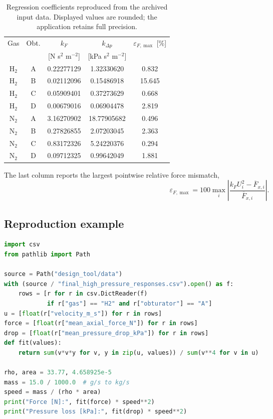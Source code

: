\begin{table}[H]
\centering\small
\begin{tabular}{@{}ccccc@{}}
\toprule
Gas & Obt. & $k_F$ & $k_{\Delta p}$ & $\varepsilon_{F,\max}$ [\%]\\
 & & [N s$^2$ m$^{-2}$] & [kPa s$^2$ m$^{-2}$] & \\
\midrule
$\mathrm{H}_2$ & A & 0.22277129 & 1.32330620 & 0.832\\
$\mathrm{H}_2$ & B & 0.02112096 & 0.15486918 & 15.645\\
$\mathrm{H}_2$ & C & 0.05909401 & 0.37273629 & 0.668\\
$\mathrm{H}_2$ & D & 0.00679016 & 0.06904478 & 2.819\\
\midrule
$\mathrm{N}_2$ & A & 3.16270902 & 18.77905682 & 0.496\\
$\mathrm{N}_2$ & B & 0.27826855 & 2.07203045 & 2.363\\
$\mathrm{N}_2$ & C & 0.83172326 & 5.24220376 & 0.294\\
$\mathrm{N}_2$ & D & 0.09712325 & 0.99642049 & 1.881\\
\bottomrule
\end{tabular}
\caption{Regression coefficients reproduced from the archived input data. Displayed values are rounded; the application retains full precision.}
\label{tab:app_fit_coefficients}
\end{table}

The last column reports the largest pointwise relative force mismatch,
\[
\varepsilon_{F,\max}=100\max_i\left|\frac{k_F U_i^2-\overline F_{x,i}}{\overline F_{x,i}}\right|.
\]

\clearpage
\subsection{Reproduction example}
\begin{lstlisting}[language=Python,numbers=none,caption={Independent hydrogen A check, run from the repository root.}]
import csv
from pathlib import Path

source = Path("design_tool/data")
with (source / "final_high_pressure_responses.csv").open() as f:
    rows = [r for r in csv.DictReader(f)
            if r["gas"] == "H2" and r["obturator"] == "A"]
u = [float(r["velocity_m_s"]) for r in rows]
force = [float(r["mean_axial_force_N"]) for r in rows]
drop = [float(r["mean_pressure_drop_kPa"]) for r in rows]
def fit(values):
    return sum(v*v*y for v, y in zip(u, values)) / sum(v**4 for v in u)

rho, area = 33.77, 4.658925e-5
mass = 15.0 / 1000.0  # g/s to kg/s
speed = mass / (rho * area)
print("Force [N]:", fit(force) * speed**2)
print("Pressure loss [kPa]:", fit(drop) * speed**2)
\end{lstlisting}

